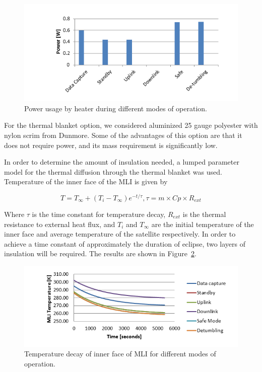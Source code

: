 \documentclass[12pt]{article}
\begin{document}
\begin{figure}[ht]%
\centering
\includegraphics{images/thermal-power-usage}
\caption{Power usage by heater during different modes of operation.}%
\label{fig:thermal-power-usage}%
\end{figure}

For the thermal blanket option, we considered aluminized 25 gauge polyester with nylon scrim from Dunmore. Some of the advantages of this option are that it does not require power, and its mass requirement is significantly low.

In order to determine the amount of insulation needed, a lumped parameter model for the thermal diffusion through the thermal blanket was used. Temperature of the inner face of the MLI is given by

\begin{equation}
T = T_\infty + (T_i- T_\infty)e^{-t/\tau}, \tau = m \times Cp \times R_{ext}
\label{eq:thermal-inner-MLI}
\end{equation}

Where $\tau$ is the time constant for temperature decay, $R_{ext}$ is the thermal resistance to external heat flux, and $T_i$ and $T_\infty$ are the initial temperature of the inner face and average temperature of the satellite respectively. In order to achieve a time constant of approximately the duration of eclipse, two layers of insulation will be required. The results are shown in Figure~\ref{fig:thermal-decay}.

\begin{figure}[ht]%
\centering
\includegraphics{images/thermal-decay}%
\caption{Temperature decay of inner face of MLI for different modes of operation.}%
\label{fig:thermal-decay}%
\end{figure}
\end{document}

